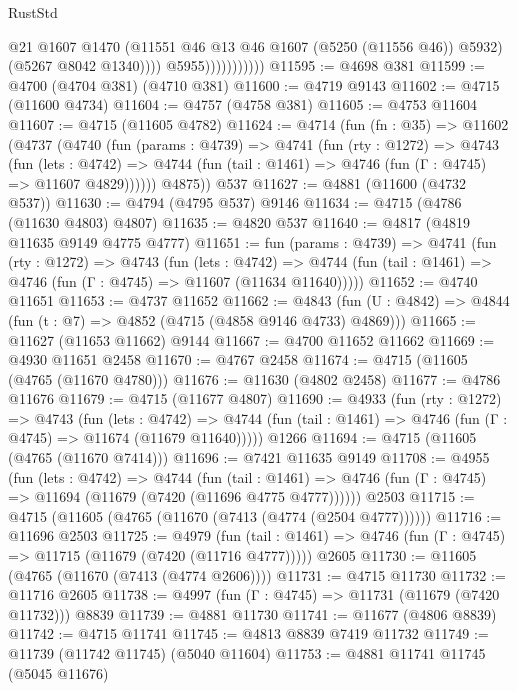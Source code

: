 \begin{lexlean}{RustStd}
\begin{coremodule}
                                @21
                                @1607
                                @1470
                                (@11551 @46 @13 @46 @1607 (@5250 (@11556 @46)) @5932)
                                (@5267 @8042 @1340))))
                          @5955)))))))))))
@11595 := @4698 @381
@11599 := @4700 (@4704 @381) (@4710 @381)
@11600 := @4719 @9143
@11602 := @4715 (@11600 @4734)
@11604 := @4757 (@4758 @381)
@11605 := @4753 @11604
@11607 := @4715 (@11605 @4782)
@11624 := @4714
    (fun (fn : @35) =>
    @11602
      (@4737
        (@4740
          (fun (params : @4739) =>
          @4741
            (fun (rty : @1272) =>
            @4743
              (fun (lets : @4742) =>
              @4744 (fun (tail : @1461) => @4746 (fun (Γ : @4745) => @11607 @4829))))))
        @4875))
    @537
@11627 := @4881 (@11600 (@4732 @537))
@11630 := @4794 (@4795 @537) @9146
@11634 := @4715 (@4786 (@11630 @4803) @4807)
@11635 := @4820 @537
@11640 := @4817 (@4819 @11635 @9149 @4775 @4777)
@11651 := fun (params : @4739) =>
  @4741
    (fun (rty : @1272) =>
    @4743
      (fun (lets : @4742) =>
      @4744 (fun (tail : @1461) => @4746 (fun (Γ : @4745) => @11607 (@11634 @11640)))))
@11652 := @4740 @11651
@11653 := @4737 @11652
@11662 := @4843 (fun (U : @4842) => @4844 (fun (t : @7) => @4852 (@4715 (@4858 @9146 @4733) @4869)))
@11665 := @11627 (@11653 @11662) @9144
@11667 := @4700 @11652 @11662
@11669 := @4930 @11651 @2458
@11670 := @4767 @2458
@11674 := @4715 (@11605 (@4765 (@11670 @4780)))
@11676 := @11630 (@4802 @2458)
@11677 := @4786 @11676
@11679 := @4715 (@11677 @4807)
@11690 := @4933
    (fun (rty : @1272) =>
    @4743
      (fun (lets : @4742) =>
      @4744 (fun (tail : @1461) => @4746 (fun (Γ : @4745) => @11674 (@11679 @11640)))))
    @1266
@11694 := @4715 (@11605 (@4765 (@11670 @7414)))
@11696 := @7421 @11635 @9149
@11708 := @4955
    (fun (lets : @4742) =>
    @4744
      (fun (tail : @1461) =>
      @4746 (fun (Γ : @4745) => @11694 (@11679 (@7420 (@11696 @4775 @4777))))))
    @2503
@11715 := @4715 (@11605 (@4765 (@11670 (@7413 (@4774 (@2504 @4777))))))
@11716 := @11696 @2503
@11725 := @4979
    (fun (tail : @1461) => @4746 (fun (Γ : @4745) => @11715 (@11679 (@7420 (@11716 @4777)))))
    @2605
@11730 := @11605 (@4765 (@11670 (@7413 (@4774 @2606))))
@11731 := @4715 @11730
@11732 := @11716 @2605
@11738 := @4997 (fun (Γ : @4745) => @11731 (@11679 (@7420 @11732))) @8839
@11739 := @4881 @11730
@11741 := @11677 (@4806 @8839)
@11742 := @4715 @11741
@11745 := @4813 @8839 @7419 @11732
@11749 := @11739 (@11742 @11745) (@5040 @11604)
@11753 := @4881 @11741 @11745 (@5045 @11676)

\end{coremodule}
\end{lexlean}
